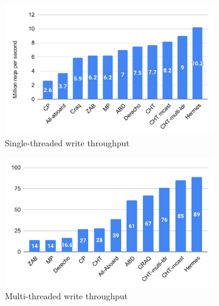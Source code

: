 \begin{figure}[t]
\centering
  \begin{subfigure}[b]{0.33\textwidth}
    \includegraphics[width=\textwidth]{1_figures/single-thread.pdf}
    \caption{Single-threaded write throughput}
  \label{fig:single-thr}
  \end{subfigure}
  \begin{subfigure}[b]{0.33\textwidth}
    \includegraphics[width=\textwidth]{1_figures/Write-only-chart.pdf}
    \caption{Multi-threaded write throughput}
  \label{fig:write-all}
  \end{subfigure}
  \begin{subfigure}[b]{0.33\textwidth} 
  

\end{subfigure}
\end{figure}
